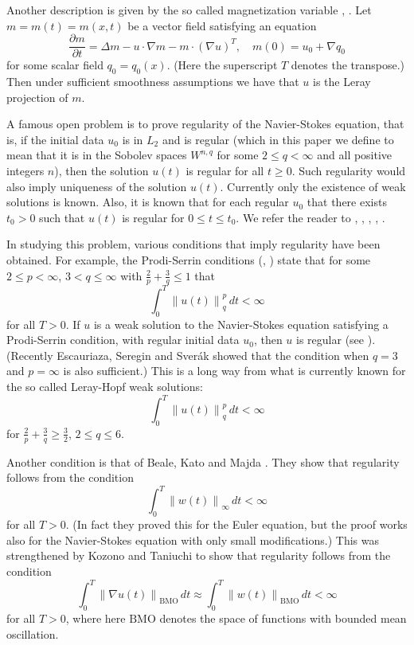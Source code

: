 \documentclass[12pt]{amsart}
\theoremstyle{remark}
\newcommand{\snormo}[1]{{\mathopen\|#1\mathclose\|}}
\newcommand{\BMO}{\mathrm{BMO}}
\begin{document}
Another description is given by the so called magnetization variable
\cite{chorin}, \cite{montgomery-smith-pokorny}.  Let $m = m(t) = m(x,t)$ 
be a vector field satisfying an equation
$$ \frac{\partial m}{\partial t}
   = \Delta m - u \cdot \nabla m - m \cdot (\nabla u)^T ,
   \quad m(0) = u_0 + \nabla q_0 $$
for some scalar field $q_0=q_0(x)$.  (Here the superscript $T$ denotes
the transpose.)
Then under sufficient smoothness
assumptions we have that $u$ is the Leray projection of $m$.

A famous open problem is to prove regularity of the Navier-Stokes
equation, that is, if the initial data $u_0$ is in $L_2$ and is
regular (which in this paper we define to mean that it is
in the Sobolev spaces $W^{n,q}$ for some $2\le q<\infty$ and all positive
integers $n$), then the solution $u(t)$ is regular for all
$t\ge0$.  Such regularity would also imply uniqueness of the solution
$u(t)$.  Currently only the existence of weak solutions is known.
Also, it is known that for each regular $u_0$ that there exists
$t_0>0$ such that $u(t)$ is regular for $0\le t \le t_0$.
We refer the reader to 
\cite{cannone}, \cite{constantin-foias}, \cite{doering-gibbons},
\cite{lemarie-rieusset}, \cite{temam}.

In studying this problem, various conditions that imply regularity
have been obtained.  For example, the 
Prodi-Serrin conditions (\cite{prodi}, \cite{serrin})
state that for some
$2 \le p < \infty$, $3<q\le\infty$ with
$\frac2p + \frac 3q \le 1$ that
$$ \int_0^T \snormo{u(t)}_q^p \, dt < \infty $$
for all $T>0$.
If $u$ is
a weak solution to the Navier-Stokes equation 
satisfying a Prodi-Serrin condition,
with regular initial
data $u_0$, then $u$ is regular (see \cite{sohr}).
(Recently Escauriaza, Seregin and Sver\'ak \cite{escauriaza et al}
showed that the condition when $q=3$ and $p=\infty$ is also sufficient.)
This is a long way from what is currently known for the so called Leray-Hopf 
weak
solutions:
$$ \int_0^T \snormo{u(t)}_q^p \, dt < \infty $$
for $\frac2p + \frac 3q \ge \frac32$, $2 \le q \le 6$.

Another condition is that of Beale, Kato and Majda
\cite{beale-kato-majda}.  They show that regularity
follows from the condition
$$ \int_0^T \snormo{w(t)}_\infty \, dt < \infty $$
for all $T > 0$.
(In fact they proved this for the Euler equation, but the
proof works also for the Navier-Stokes equation with only small modifications.)
This was strengthened by Kozono and Taniuchi 
\cite{kozono-taniuchi} to show that regularity follows
from the condition
$$ \int_0^T \snormo{\nabla u(t)}_\BMO \, dt \approx
   \int_0^T \snormo{w(t)}_\BMO \, dt < \infty $$
for all $T > 0$, where here $\BMO$ denotes the space of functions with bounded
mean oscillation.
\end{document}
